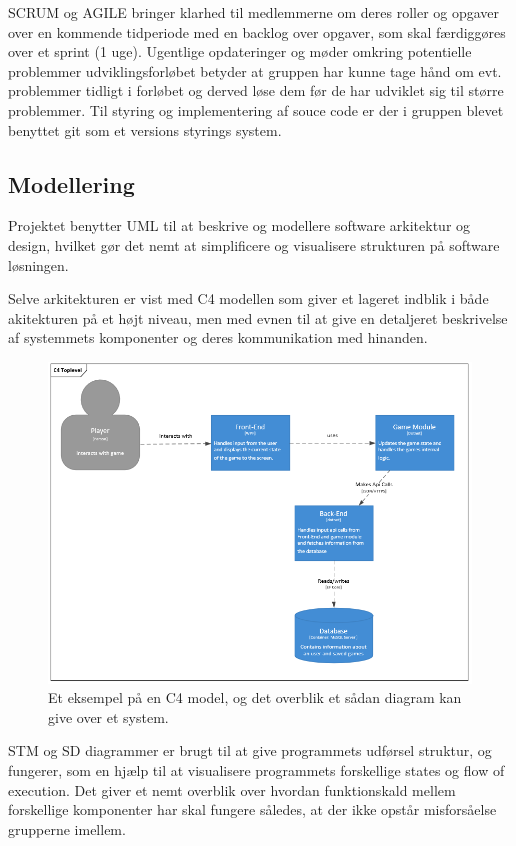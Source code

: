 SCRUM og AGILE bringer klarhed til medlemmerne om deres roller og opgaver over en 
kommende tidperiode med en backlog over opgaver, som skal færdiggøres over et sprint (1 uge).
Ugentlige opdateringer og møder omkring potentielle problemmer udviklingsforløbet betyder
at gruppen har kunne tage hånd om evt. problemmer tidligt i forløbet og derved løse dem
før de har udviklet sig til større problemmer.
Til styring og implementering af souce code er der i gruppen blevet benyttet git som et versions styrings system.

\subsection{Modellering}
Projektet benytter UML til at beskrive og modellere software arkitektur
og design, hvilket gør det nemt at simplificere og visualisere strukturen på software
løsningen. 

Selve arkitekturen er vist med C4 modellen som giver et lageret indblik i både
akitekturen på et højt niveau, men med evnen til at give en detaljeret beskrivelse
af systemmets komponenter og deres kommunikation med hinanden.

\begin{figure}[H]
  \centering
  \includegraphics[scale=0.8]{02-Body/Images/C4TopLvlDB.PNG}
  \caption{Et eksempel på en C4 model, og det overblik et sådan diagram kan give over et system.}
  \label{fig:c4}
\end{figure}

STM og SD diagrammer er brugt til at give programmets udførsel struktur, og fungerer,
som en hjælp til at visualisere programmets forskellige states og flow of execution.
Det giver et nemt overblik over hvordan funktionskald mellem forskellige komponenter
har skal fungere således, at der ikke opstår misforsåelse grupperne imellem. 

